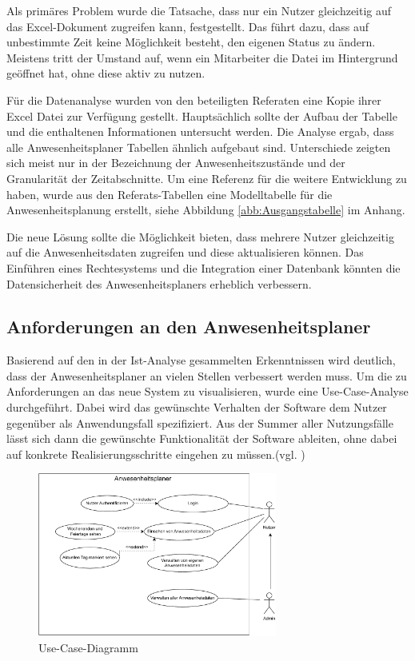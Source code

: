 Als primäres Problem wurde die Tatsache, dass nur ein Nutzer gleichzeitig auf das Excel-Dokument zugreifen kann, festgestellt. Das führt dazu, dass auf unbestimmte Zeit keine Möglichkeit besteht, den eigenen Status zu ändern. Meistens tritt der Umstand auf, wenn ein Mitarbeiter die Datei im Hintergrund geöffnet hat, ohne diese aktiv zu nutzen.

Für die Datenanalyse wurden von den beteiligten Referaten eine Kopie ihrer Excel Datei zur Verfügung gestellt. Hauptsächlich sollte der Aufbau der Tabelle und die enthaltenen Informationen untersucht werden. Die Analyse ergab, dass alle Anwesenheitsplaner Tabellen ähnlich aufgebaut sind. Unterschiede zeigten sich meist nur in der Bezeichnung der Anwesenheitszustände und der Granularität der Zeitabschnitte. Um eine Referenz für die weitere Entwicklung zu haben, wurde aus den Referats-Tabellen eine Modelltabelle für die Anwesenheitsplanung erstellt, siehe Abbildung \ref{abb:Ausgangstabelle} im Anhang.

Die neue Lösung sollte die Möglichkeit bieten, dass mehrere Nutzer gleichzeitig auf die Anwesenheitsdaten zugreifen und diese aktualisieren können. Das Einführen eines Rechtesystems und die Integration einer Datenbank könnten die Datensicherheit des Anwesenheitsplaners erheblich verbessern.

\subsection{Anforderungen an den Anwesenheitsplaner}
\label{sec:Soll-Zustand}
Basierend auf den in der Ist-Analyse gesammelten Erkenntnissen wird deutlich, dass der Anwesenheitsplaner an vielen Stellen verbessert werden muss. Um die zu Anforderungen an das neue System zu visualisieren, wurde eine Use-Case-Analyse durchgeführt. Dabei wird das gewünschte Verhalten der Software dem Nutzer gegenüber als Anwendungsfall spezifiziert. Aus der Summer aller Nutzungsfälle lässt sich dann die gewünschte Funktionalität der Software ableiten, ohne dabei auf konkrete Realisierungsschritte eingehen zu müssen.(vgl. \cite[S. 164]{neumann-2002})

\begin{figure}[htb]
    \centering
    \includegraphics[width=0.7\textwidth,angle=0]{abb/use-case-diagramm.pdf}
    \caption[Beschreibung]{Use-Case-Diagramm}
    \label{fig:Use-Case-Diagramm}
\end{figure}

